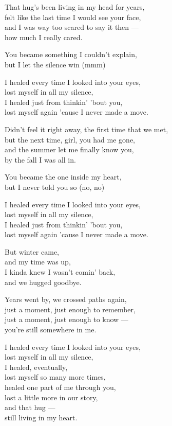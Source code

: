 \begin{lyrics}
That hug's been living in my head for years,\\
felt like the last time I would see your face,\\
and I was way too scared to say it then —\\
how much I really cared.

You became something I couldn't explain,\\
but I let the silence win (mmm)

I healed every time I looked into your eyes,\\
lost myself in all my silence,\\
I healed just from thinkin' 'bout you,\\
lost myself again 'cause I never made a move.

Didn't feel it right away, the first time that we met,\\
but the next time, girl, you had me gone,\\
and the summer let me finally know you,\\
by the fall I was all in.

You became the one inside my heart,\\
but I never told you so (no, no)

I healed every time I looked into your eyes,\\
lost myself in all my silence,\\
I healed just from thinkin' 'bout you,\\
lost myself again 'cause I never made a move.

But winter came,\\
and my time was up,\\
I kinda knew I wasn't comin' back,\\
and we hugged goodbye.

Years went by, we crossed paths again,\\
just a moment, just enough to remember,\\
just a moment, just enough to know —\\
you're still somewhere in me.

I healed every time I looked into your eyes,\\
lost myself in all my silence,\\
I healed, eventually,\\
lost myself so many more times,\\
healed one part of me through you,\\
lost a little more in our story,\\
and that hug —\\
still living in my heart.
\end{lyrics}

